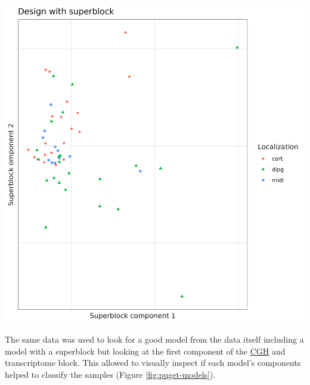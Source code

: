 \documentclass[
  12pt,
  a4paper,
  twoside,
  openright]{book}
\let\origfigure\figure
\let\endorigfigure\endfigure
\renewenvironment{figure}[1][2] {
    \expandafter\origfigure\expandafter[!htbp]
} {
    \endorigfigure
}
\begin{document}
\begin{figure}
\includegraphics[width=1\linewidth]{images/pugets_superblock} \caption[Superblock components of the Puget dataset.]{Superblock components of the Puget dataset. First components of the model superblock.2 which has all the data of the samples on the Puget's dataset. Samples colored and shaped acording to the localization of the tumor. There is a mix of samples of all locations and then some far from it.}\label{fig:puget-superblock}
\end{figure}

The same data was used to look for a good model from the data itself including a model with a superblock but looking at the first component of the \protect\hyperlink{acronyms_CGH}{CGH} and transcriptome block.
This allowed to visually inspect if each model's components helped to classify the samples (Figure \ref{fig:puget-models}).
\end{document}
